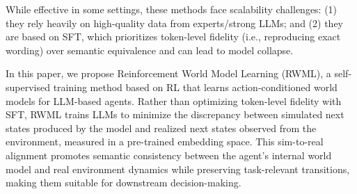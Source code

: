 \documentclass{article}
\theoremstyle{plain}
\theoremstyle{definition}
\theoremstyle{remark}
\newcommand{\ie}{i.e.,}
\newcommand{\method}[0]{Reinforcement World Model Learning}
\newcommand{\shortmethod}[0]{RWML}
\newcommand{\wmrlshort}[0]{\shortmethod}
\begin{document}
While effective in some settings, these methods face scalability challenges: (1) they rely heavily on high-quality data from experts/strong LLMs; and (2) they are based on SFT, which prioritizes token-level fidelity (\ie{} reproducing exact wording) over semantic equivalence and can lead to model collapse.

In this paper, we propose \method{} (\shortmethod{}), a self-supervised training method based on RL that learns action-conditioned world models for LLM-based agents.
Rather than optimizing token-level fidelity with SFT, \shortmethod{} trains LLMs to minimize the discrepancy between simulated next states produced by the model and realized next states observed from the environment, measured in a pre-trained embedding space.
This sim-to-real alignment promotes semantic consistency between the agent's internal world model and real environment dynamics while preserving task-relevant transitions, making them suitable for downstream decision-making.
\end{document}
